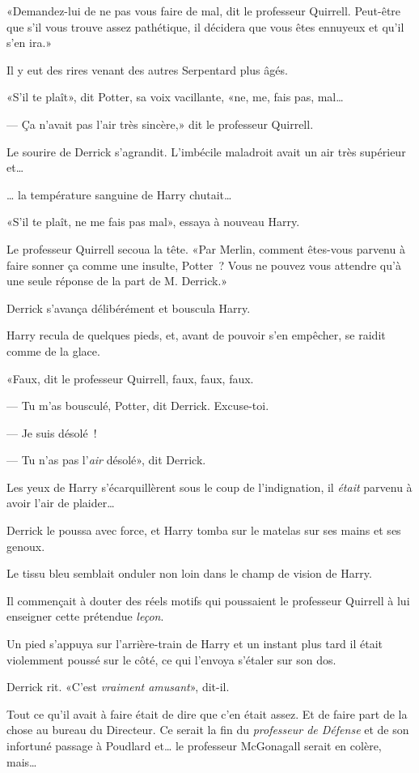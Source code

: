 «Demandez-lui de ne pas vous faire de mal, dit le professeur Quirrell. Peut-être que s'il vous trouve assez pathétique, il décidera que vous êtes ennuyeux et qu'il s'en ira.»

Il y eut des rires venant des autres Serpentard plus âgés.

«S'il te plaît», dit Potter, sa voix vacillante, «ne, me, fais pas, mal…

--- Ça n'avait pas l'air très sincère,» dit le professeur Quirrell.

Le sourire de Derrick s'agrandit. L'imbécile maladroit avait un air très supérieur et…

… la température sanguine de Harry chutait…

«S'il te plaît, ne me fais pas mal», essaya à nouveau Harry.

Le professeur Quirrell secoua la tête. «Par Merlin, comment êtes-vous parvenu à faire sonner ça comme une insulte, Potter~? Vous ne pouvez vous attendre qu'à une seule réponse de la part de M. Derrick.»

Derrick s'avança délibérément et bouscula Harry.

Harry recula de quelques pieds, et, avant de pouvoir s'en empêcher, se raidit comme de la glace.

«Faux, dit le professeur Quirrell, faux, faux, faux.

--- Tu m'as bousculé, Potter, dit Derrick. Excuse-toi.

--- Je suis désolé~!

--- Tu n'as pas l'\emph{air} désolé», dit Derrick.

Les yeux de Harry s'écarquillèrent sous le coup de l'indignation, il \emph{était} parvenu à avoir l'air de plaider…

Derrick le poussa avec force, et Harry tomba sur le matelas sur ses mains et ses genoux.

Le tissu bleu semblait onduler non loin dans le champ de vision de Harry.

Il commençait à douter des réels motifs qui poussaient le professeur Quirrell à lui enseigner cette prétendue \emph{leçon}.

Un pied s'appuya sur l'arrière-train de Harry et un instant plus tard il était violemment poussé sur le côté, ce qui l'envoya s'étaler sur son dos.

Derrick rit. «C'est \emph{vraiment amusant}», dit-il.

Tout ce qu'il avait à faire était de dire que c'en était assez. Et de faire part de la chose au bureau du Directeur. Ce serait la fin du \emph{professeur de Défense} et de son infortuné passage à Poudlard et… le professeur McGonagall serait en colère, mais…

